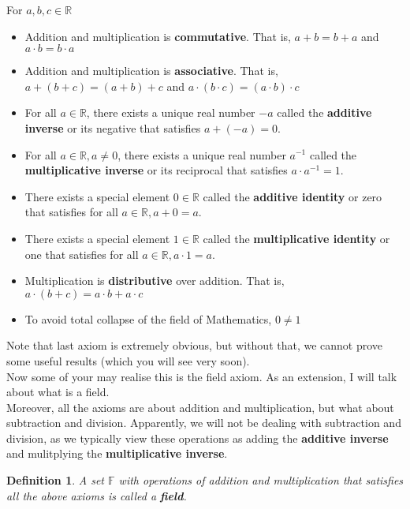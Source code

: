 \documentclass{book}
\newtheorem{definition}[theorem]{Definition}
\begin{document}
For $a, b, c \in \mathbb{R}$

\begin{itemize}[itemsep = 0pt]
    \item Addition and multiplication is \textbf{commutative}. That is, $a + b = b + a$ and $a \cdot b = b \cdot a$
    \item Addition and multiplication is \textbf{associative}. That is, $a + (b + c) = (a + b) + c$ and $a \cdot (b \cdot c) = (a \cdot b) \cdot c$
    \item For all $a \in \mathbb{R}$, there exists a unique real number $-a$ called the \textbf{additive inverse} or its negative that satisfies $a + (-a) = 0$.
    \item For all $a \in \mathbb{R}, a \neq 0$, there exists a unique real number $a^{-1}$ called the \textbf{multiplicative inverse} or its reciprocal that satisfies $a \cdot a^{-1} = 1$.
    \item There exists a special element $0 \in \mathbb{R}$ called the \textbf{additive identity} or zero that satisfies for all $a \in \mathbb{R}, a + 0 = a$.
    \item There exists a special element $1 \in \mathbb{R}$ called the \textbf{multiplicative identity} or one that satisfies for all $a \in \mathbb{R}, a \cdot 1 = a$.
    \item Multiplication is \textbf{distributive} over addition. That is, $a \cdot (b + c) = a \cdot b + a \cdot c$
    \item To avoid total collapse of the field of Mathematics, $0 \neq 1$
\end{itemize}

Note that last axiom is extremely obvious, but without that, we cannot prove some useful results (which you will see very soon).\\
Now some of your may realise this is the field axiom. As an extension, I will talk about what is a field. \\
Moreover, all the axioms are about addition and multiplication, but what about subtraction and division. Apparently, we will not be dealing with subtraction and division, as we typically view these operations as adding the \textbf{additive inverse} and mulitplying the \textbf{multiplicative inverse}.

\begin{definition}
    A set $\mathbb{F}$ with operations of addition and multiplication that satisfies all the above axioms is called a \textbf{field}.
\end{definition}
\end{document}
